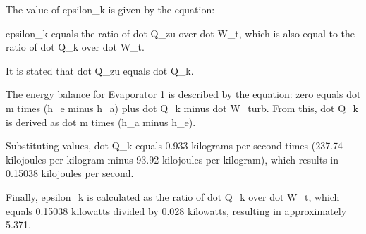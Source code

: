 The value of epsilon_k is given by the equation:

epsilon_k equals the ratio of dot Q_zu over dot W_t, which is also equal to the ratio of dot Q_k over dot W_t.

It is stated that dot Q_zu equals dot Q_k.

The energy balance for Evaporator 1 is described by the equation:
zero equals dot m times (h_e minus h_a) plus dot Q_k minus dot W_turb.
From this, dot Q_k is derived as dot m times (h_a minus h_e).

Substituting values, dot Q_k equals 0.933 kilograms per second times (237.74 kilojoules per kilogram minus 93.92 kilojoules per kilogram), which results in 0.15038 kilojoules per second.

Finally, epsilon_k is calculated as the ratio of dot Q_k over dot W_t, which equals 0.15038 kilowatts divided by 0.028 kilowatts, resulting in approximately 5.371.